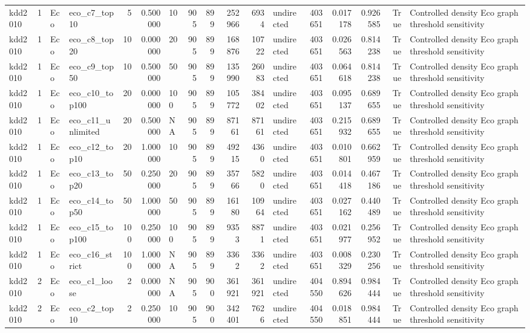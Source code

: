 \begin{tabular}{lrllrrlrrrrlrrrrl}
kdd2010 & 1 & Eco & eco_c7_top10 & 5 & 0.500000 & 10 & 905 & 899 & 252966 & 6934 & undirected & 403651 & 0.017178 & 0.926585 & True & Controlled density Eco graph threshold sensitivity \\
kdd2010 & 1 & Eco & eco_c8_top20 & 10 & 0.000000 & 20 & 905 & 899 & 168876 & 10722 & undirected & 403651 & 0.026563 & 0.814238 & True & Controlled density Eco graph threshold sensitivity \\
kdd2010 & 1 & Eco & eco_c9_top50 & 10 & 0.500000 & 50 & 905 & 899 & 135990 & 26083 & undirected & 403651 & 0.064618 & 0.814238 & True & Controlled density Eco graph threshold sensitivity \\
kdd2010 & 1 & Eco & eco_c10_top100 & 20 & 0.000000 & 100 & 905 & 899 & 105772 & 38402 & undirected & 403651 & 0.095137 & 0.689655 & True & Controlled density Eco graph threshold sensitivity \\
kdd2010 & 1 & Eco & eco_c11_unlimited & 20 & 0.500000 & NA & 905 & 899 & 87161 & 87161 & undirected & 403651 & 0.215932 & 0.689655 & True & Controlled density Eco graph threshold sensitivity \\
kdd2010 & 1 & Eco & eco_c12_top10 & 20 & 1.000000 & 10 & 905 & 899 & 49215 & 4360 & undirected & 403651 & 0.010801 & 0.662959 & True & Controlled density Eco graph threshold sensitivity \\
kdd2010 & 1 & Eco & eco_c13_top20 & 50 & 0.250000 & 20 & 905 & 899 & 35766 & 5820 & undirected & 403651 & 0.014418 & 0.467186 & True & Controlled density Eco graph threshold sensitivity \\
kdd2010 & 1 & Eco & eco_c14_top50 & 50 & 1.000000 & 50 & 905 & 899 & 16180 & 10964 & undirected & 403651 & 0.027162 & 0.440489 & True & Controlled density Eco graph threshold sensitivity \\
kdd2010 & 1 & Eco & eco_c15_top100 & 100 & 0.250000 & 100 & 905 & 899 & 9353 & 8871 & undirected & 403651 & 0.021977 & 0.256952 & True & Controlled density Eco graph threshold sensitivity \\
kdd2010 & 1 & Eco & eco_c16_strict & 100 & 1.000000 & NA & 905 & 899 & 3362 & 3362 & undirected & 403651 & 0.008329 & 0.230256 & True & Controlled density Eco graph threshold sensitivity \\
kdd2010 & 2 & Eco & eco_c1_loose & 2 & 0.000000 & NA & 905 & 900 & 361921 & 361921 & undirected & 404550 & 0.894626 & 0.984444 & True & Controlled density Eco graph threshold sensitivity \\
kdd2010 & 2 & Eco & eco_c2_top10 & 2 & 0.250000 & 10 & 905 & 900 & 342401 & 7626 & undirected & 404550 & 0.018851 & 0.984444 & True & Controlled density Eco graph threshold sensitivity \\

\end{tabular}
